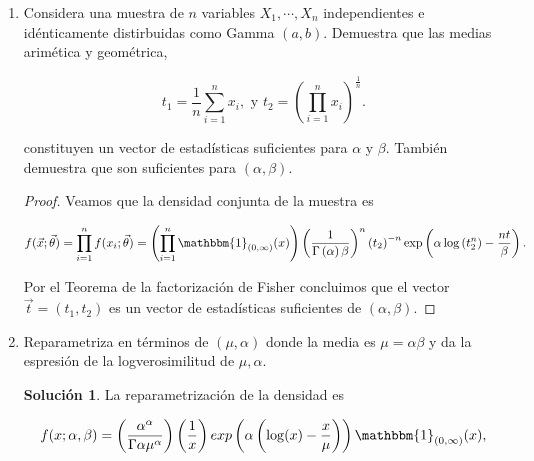 \documentclass[letterpaper]{article}
\theoremstyle{definition}
\theoremstyle{lemathm}
\theoremstyle{lemathm}
\newtheorem{sol}{Solución}
\theoremstyle{lemathm}
\theoremstyle{lemademthm}
\newcommand{\txty}{\text{ y }}
\newcommand{\pars}[1]{\left( #1 \right) }
\newcommand{\1}{\mathbbm{1}}
\begin{document}
\begin{enumerate}
\begin{enumerate}
			\begin{proof}
				Podemos reexpresarla a la densidad de la distribución Gamma de la siguiente forma

				\[f(x;\alpha,\beta) = \pars{\frac{1}{\Gamma{\alpha}\beta^{\alpha}}} \pars{\frac{1}{x}} exp\pars{\alpha\log(x)-\frac{x}{\beta}} \1_{(0,\infty)}(x).\]

				Donde su soporte no depende de parámetros desconocidos y $A(\theta) = \frac{1}{\Gamma{\alpha}\beta^{\alpha}}$, $B(x) = \frac{1}{x}$, $C_1(\theta) = \alpha$, $D_1(x) = log(x)$, $C_2(\theta) = \frac{1}{\beta}$ y $D(x) = x$, por lo tanto la distirbución Gamma pertenece a la familia exponencial.
			\end{proof}

			\item Considera una muestra de $n$ variables $X_1,\cdots,X_n$ independientes e idénticamente distirbuidas como Gamma $(a,b)$. Demuestra que las medias arimética y geométrica,
			
			\[t_1 = \frac{1}{n}\sum_{i=1}^n x_i,\txty t_2=\pars{\prod_{i=1}^n x_i}^{\frac{1}{n}}.\]

			constituyen un vector de estadísticas suficientes para $\alpha$ y $\beta$. También demuestra que son suficientes para $\pars{\alpha, \beta}$.

			\begin{proof}
				Veamos que la densidad conjunta de la muestra es

				\[f(\vec{x};\vec{\theta}) = \prod_{i=1}^n f(x_i;\vec{\theta}) = \pars{\prod_{i=1}^n \1_{(0,\infty)}(x)} \pars{\frac{1}{\Gamma\pars{\alpha}\beta}}^n\pars{t_2}^{-n}\exp\pars{\alpha\log\pars{t_2^n}-\frac{nt}{\beta}}.\]

				Por el Teorema de la factorización de Fisher concluimos que el vector $\vec{t} = \pars{t_1,t_2}$ es un vector de estadísticas suficientes de $\pars{\alpha,\beta}$.
			\end{proof}

			\item Reparametriza en términos de $\pars{\mu, \alpha}$ donde la media es $\mu = \alpha\beta$ y da la espresión de la logverosimilitud de $\mu, \alpha$.
			
			\begin{sol}
				La reparametrización de la densidad es

				\[f(x;\alpha,\beta) = \pars{\frac{\alpha^\alpha}{\Gamma{\alpha}\mu^{\alpha}}} \pars{\frac{1}{x}} exp\pars{\alpha\pars{\log(x)-\frac{x}{\mu}}} \1_{(0,\infty)}(x),\]


\end{sol}
\end{enumerate}
\end{enumerate}
\end{document}
